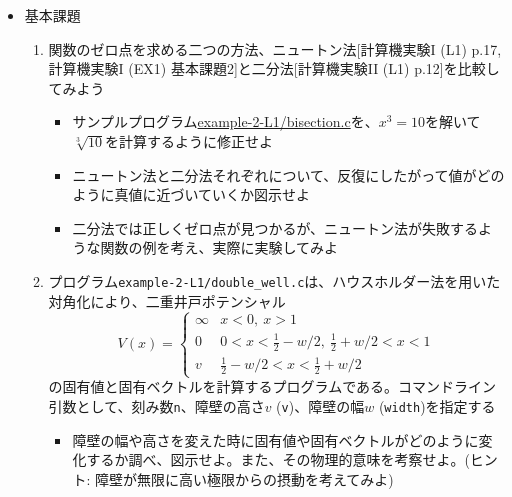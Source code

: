 \documentclass[11pt]{jarticle}
\begin{document}
\begin{itemize}
\item 基本課題
  \begin{enumerate}
  \item 関数のゼロ点を求める二つの方法、ニュートン法[計算機実験I (L1) p.17, 計算機実験I (EX1) 基本課題2]と二分法[計算機実験II (L1) p.12]を比較してみよう
    \begin{itemize}
    \item サンプルプログラム\href{https://github.com/todo-group/computer-experiments/blob/master/exercise/basics/bisection.c}{example-2-L1/bisection.c}を、$x^3=10$を解いて$\sqrt[3]{10}$を計算するように修正せよ
    \item ニュートン法と二分法それぞれについて、反復にしたがって値がどのように真値に近づいていくか図示せよ
    \item 二分法では正しくゼロ点が見つかるが、ニュートン法が失敗するような関数の例を考え、実際に実験してみよ
    \end{itemize}
  \item プログラム{\tt example-2-L1/double\_well.c}は、ハウスホルダー法を用いた対角化により、二重井戸ポテンシャル
    \begin{equation*}
      V(x) = \begin{cases}
        \infty & x < 0, \ x > 1 \\
        0 & 0 < x < \frac{1}{2} - w/2, \ \frac{1}{2} + w/2 < x < 1 \\
        v & \frac{1}{2} - w/2 < x < \frac{1}{2} + w/2
      \end{cases}
    \end{equation*}
    の固有値と固有ベクトルを計算するプログラムである。コマンドライン引数として、刻み数{\tt n}、障壁の高さ$v$ ({\tt v})、障壁の幅$w$ ({\tt width})を指定する
    \begin{itemize}
      \item 障壁の幅や高さを変えた時に固有値や固有ベクトルがどのように変化するか調べ、図示せよ。また、その物理的意味を考察せよ。(ヒント: 障壁が無限に高い極限からの摂動を考えてみよ)

\end{itemize}
\end{enumerate}
\end{itemize}
\end{document}

